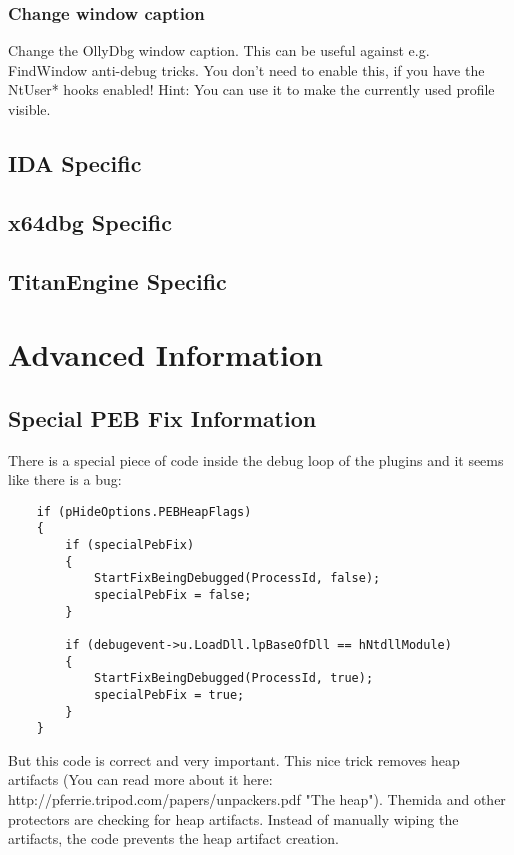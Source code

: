 \documentclass[10pt,a4paper]{article}
\begin{document}
\subsubsection{Change window caption}
Change the OllyDbg window caption. This can be useful against e.g. FindWindow anti-debug tricks. You don't need to enable this, if you have the NtUser* hooks enabled! Hint: You can use it to make the currently used profile visible.
\subsection{IDA Specific}
\subsection{x64dbg Specific}
\subsection{TitanEngine Specific}
\section{Advanced Information}
\subsection{Special PEB Fix Information}

There is a special piece of code inside the debug loop of the plugins and it seems like there is a bug:
\begin{lstlisting}
    if (pHideOptions.PEBHeapFlags)
    {
        if (specialPebFix)
        {
            StartFixBeingDebugged(ProcessId, false);
            specialPebFix = false;
        }

        if (debugevent->u.LoadDll.lpBaseOfDll == hNtdllModule)
        {
            StartFixBeingDebugged(ProcessId, true);
            specialPebFix = true;
        }
    }
\end{lstlisting}
But this code is correct and very important. This nice trick removes heap artifacts (You can read more about it here: http://pferrie.tripod.com/papers/unpackers.pdf "The heap"). Themida and other protectors are checking for heap artifacts. Instead of manually wiping the artifacts, the code prevents the heap artifact creation.
\end{document}
